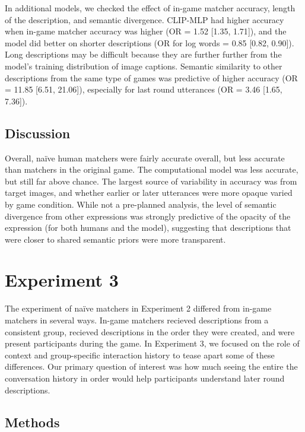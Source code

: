 \documentclass[10pt, letterpaper]{article}
\begin{document}
In additional models, we checked the effect of in-game matcher accuracy,
length of the description, and semantic divergence. CLIP-MLP had higher
accuracy when in-game matcher accuracy was higher (OR = 1.52 {[}1.35,
1.71{]}), and the model did better on shorter descriptions (OR for log
words = 0.85 {[}0.82, 0.90{]}). Long descriptions may be difficult
because they are further further from the model's training distribution
of image captions. Semantic similarity to other descriptions from the
same type of games was predictive of higher accuracy (OR = 11.85
{[}6.51, 21.06{]}), especially for last round utterances (OR = 3.46
{[}1.65, 7.36{]}).

\subsection{Discussion}\label{discussion}

Overall, naïve human matchers were fairly accurate overall, but less
accurate than matchers in the original game. The computational model was
less accurate, but still far above chance. The largest source of
variability in accuracy was from target images, and whether earlier or
later utterances were more opaque varied by game condition. While not a
pre-planned analysis, the level of semantic divergence from other
expressions was strongly predictive of the opacity of the expression
(for both humans and the model), suggesting that descriptions that were
closer to shared semantic priors were more transparent.

\section{Experiment 3}\label{experiment-3}

The experiment of naïve matchers in Experiment 2 differed from in-game
matchers in several ways. In-game matchers recieved descriptions from a
consistent group, recieved descriptions in the order they were created,
and were present participants during the game. In Experiment 3, we
focused on the role of context and group-specific interaction history to
tease apart some of these differences. Our primary question of interest
was how much seeing the entire the conversation history in order would
help participants understand later round descriptions.

\subsection{Methods}\label{methods-2}
\end{document}
